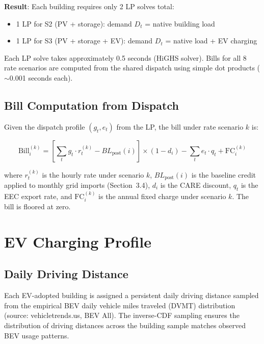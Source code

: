 \documentclass[11pt]{article}
\begin{document}
\textbf{Result}: Each building requires only 2 LP solves total:
\begin{itemize}
    \item 1 LP for S2 (PV + storage): demand $D_t$ = native building load
    \item 1 LP for S3 (PV + storage + EV): demand $D_t$ = native load + EV charging
\end{itemize}

Each LP solve takes approximately 0.5 seconds (HiGHS solver). Bills for all 8 rate scenarios are computed from the shared dispatch using simple dot products ($\sim$0.001 seconds each).

\subsection{Bill Computation from Dispatch}

Given the dispatch profile $(g_t, e_t)$ from the LP, the bill under rate scenario $k$ is:

\begin{equation}
    \text{Bill}_i^{(k)} = \left[ \sum_t g_t \cdot r_t^{(k)} - BL_{\text{post}}(i) \right] \times (1 - d_i) - \sum_t e_t \cdot q_t + \text{FC}_i^{(k)}
\end{equation}

where $r_t^{(k)}$ is the hourly rate under scenario $k$, $BL_{\text{post}}(i)$ is the baseline credit applied to monthly grid imports (Section~3.4), $d_i$ is the CARE discount, $q_t$ is the EEC export rate, and $\text{FC}_i^{(k)}$ is the annual fixed charge under scenario $k$. The bill is floored at zero.

%
%

\newpage
\section{EV Charging Profile}

\subsection{Daily Driving Distance}

Each EV-adopted building is assigned a persistent daily driving distance sampled from the empirical BEV daily vehicle miles traveled (DVMT) distribution (source: vehicletrends.us, BEV All). The inverse-CDF sampling ensures the distribution of driving distances across the building sample matches observed BEV usage patterns.
\end{document}
